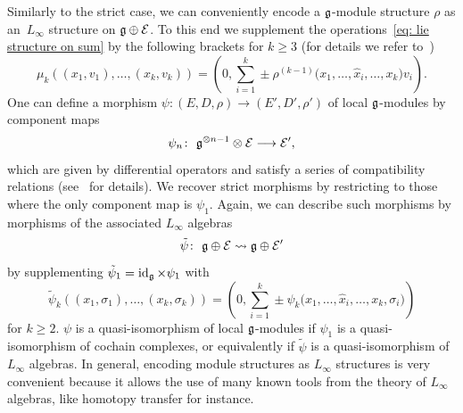 \documentclass[11pt]{article}
\numberwithin{equation}{section}
\numberwithin{equation}{section}
\def\cE{\mathcal E}\def\cF{\mathcal F}\def\cG{\mathcal G}\def\cH{\mathcal H}
\DeclareMathOperator{\id}{id}
\begin{document}
Similarly to the strict case, we can conveniently encode a $\mathfrak g$-module structure $\rho$ as an~$L_\infty$ structure on $\fg \oplus \cE$. To this end we supplement the operations~\eqref{eq: lie structure on sum} by the following brackets for $k\geq3$ (for details we refer to~\cite{Allocca, Lada})
\begin{equation*}
\mu_k((x_1,v_1),\dots,(x_k,v_k)) = \left( 0 , \sum_{i=1}^{k} \pm \rho^{(k-1)}\big(x_1,\dots,\hat{x}_i,\dots,x_k\big)v_i \right).
\end{equation*}
One can define a morphism $\psi \colon (E,D,\rho) \longrightarrow (E',D',\rho')$ of local $\mathfrak g$-modules by component maps
\begin{equation*}
\psi_n \colon \ \fg^{\otimes n-1} \otimes \cE \longrightarrow \cE' ,
\end{equation*}
which are given by differential operators and satisfy a series of compatibility relations (see~\cite{Allocca} for details). We recover strict morphisms by restricting to those where the only component map is $\psi_1$. Again, we can describe such morphisms by morphisms of the associated $L_\infty$ algebras
\begin{equation*}
\tilde{\psi} \colon \ \fg \oplus \cE \rightsquigarrow \fg \oplus \cE'
\end{equation*}
by supplementing $\tilde{\psi}_1 = \id_{\fg} \times \psi_1$ with
\begin{equation*}
\tilde{\psi}_k ((x_1,\sigma_1) , \dots , (x_k, \sigma_k)) = \left(0, \sum_{i=1}^{k} \pm \psi_k\big(x_1, \dots , \hat{x}_i , \dots , x_k , \sigma_i \big)\right)
\end{equation*}
for $k \geq 2$. $\psi$ is a quasi-isomorphism of local $\mathfrak g$-modules if $\psi_1$ is a quasi-isomorphism of cochain complexes, or equivalently if $\tilde{\psi}$ is a quasi-isomorphism of $L_\infty$ algebras. In general, encoding module structures as $L_\infty$ structures is very convenient because it allows the use of many known tools from the theory of $L_\infty$ algebras, like homotopy transfer for instance.
\end{document}
